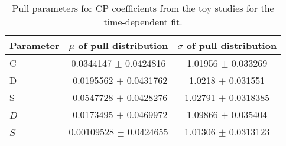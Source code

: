 \begin{table}[hp!]
\centering
\caption{Pull parameters for CP coefficients from the toy studies for the time-dependent fit.}
\begin{tabular}{l | c | c}
\hline
Parameter & $\mu$ of pull distribution & $\sigma$ of pull distribution \\
\hline
\hline
C & 0.0344147 $\pm$ 0.0424816 & 1.01956 $\pm$ 0.033269 \\
D & -0.0195562 $\pm$ 0.0431762 & 1.0218 $\pm$ 0.031551 \\
S & -0.0547728 $\pm$ 0.0428276 & 1.02791 $\pm$ 0.0318385 \\
$\bar{D}$ & -0.0173495 $\pm$ 0.0469972 & 1.09866 $\pm$ 0.035404 \\
$\bar{S}$ & 0.00109528 $\pm$ 0.0424655 & 1.01306 $\pm$ 0.0313123 \\
\hline
\end{tabular}
\label{table:Pulls_tDFit}
\end{table}